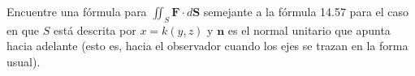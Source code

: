 \item Encuentre una fórmula para $\iint_S \mathbf{F} \cdot d\mathbf{S}$ semejante a la fórmula 14.57 para el caso en que $S$ está descrita por $x = k(y, z)$ y $\mathbf{n}$ es el normal unitario que apunta hacia adelante (esto es, hacia el observador cuando los ejes se trazan en la forma usual).
